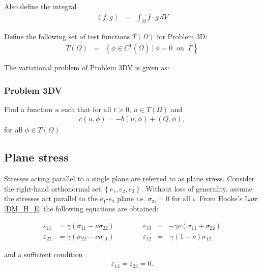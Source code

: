Also define the integral
\begin{eqnarray}
	(f,g) &=& \int_{\Omega} f\cdot g \ dV \label{eq:3D_Model:Bilinear_int}
\end{eqnarray}

Define the following set of test functions $T(\Omega)$ for Problem 3D:
\begin{eqnarray*}
	T(\Omega) & = & \left\{ \phi \in C^1(\bar{\Omega}) \ | \ \phi = 0 \ \textrm{ on } \ \Gamma \right\}
\end{eqnarray*}\label{sym:TOmega}

The variational problem of Problem 3DV is given as:
\subsubsection{Problem 3DV}\label{sssec:3D_Model:Problem3D1V}
Find a function $u$ such that for all $t>0$, $u \in T(\Omega)$ and
\begin{align}
	c(u,\phi) = -b(u,\phi) + (Q,\phi), \label{eq:3D_Model:Problem3D1VEq}
\end{align}
for all $\phi \in T(\Omega)$

\subsection{Plane stress}\label{ssec:3D_Model:PlaneStress}
Stresses acting parallel to a single plane are referred to as plane stress. 
Consider the right-hand orthonormal set $\left\{e_1, e_2, e_3\right\}$. Without
loss of generality, assume the stresses act parallel to the $e_1$-$e_2$ plane
i.e. $\sigma_{3i} = 0$ for all $i$. From Hooke's Law \eqref{DM_H_E} the
following equations are obtained: \label{sym:e_i}

\begin{equation}
	\begin{aligned}
		\varepsilon_{11} & =  \gamma  ( \sigma_{11} - \nu \sigma_{22}) \qquad \qquad \varepsilon_{33} & = & - \gamma \nu (\sigma_{11} + \sigma_{22})          \\
		\varepsilon_{22} & =   \gamma (\sigma_{22} - \nu\sigma_{11}) \qquad \qquad \varepsilon_{12}   & = & \  \gamma (1+\nu) \sigma_{12} \label{strain_comp}
	\end{aligned}
\end{equation}

and a sufficient condition
\begin{eqnarray}
	\varepsilon_{13} =  \varepsilon_{23} = 0.
\end{eqnarray}

